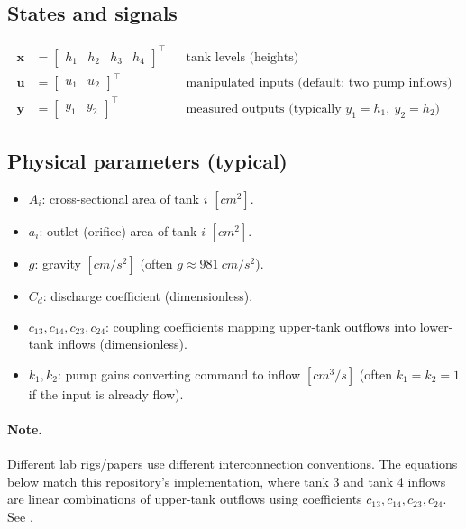 \documentclass[11pt]{article}
\begin{document}
\subsection*{States and signals}
\begin{align*}
\bm{x} &= \begin{bmatrix} h_1 & h_2 & h_3 & h_4 \end{bmatrix}^\top
&&\text{tank levels (heights)}\\
\bm{u} &= \begin{bmatrix} u_1 & u_2 \end{bmatrix}^\top
&&\text{manipulated inputs (default: two pump inflows)}\\
\bm{y} &= \begin{bmatrix} y_1 & y_2 \end{bmatrix}^\top
&&\text{measured outputs (typically }y_1=h_1,\ y_2=h_2\text{)}
\end{align*}

\subsection*{Physical parameters (typical)}
\begin{itemize}
  \item \(A_i\): cross-sectional area of tank \(i\) \([\si{cm^2}]\).
  \item \(a_i\): outlet (orifice) area of tank \(i\) \([\si{cm^2}]\).
  \item \(g\): gravity \([\si{cm/s^2}]\) (often \(g \approx 981\ \si{cm/s^2}\)).
  \item \(C_d\): discharge coefficient (dimensionless).
  \item \(c_{13},c_{14},c_{23},c_{24}\): coupling coefficients mapping upper-tank outflows into lower-tank inflows (dimensionless).
  \item \(k_1, k_2\): pump gains converting command to inflow \([\si{cm^3/s}]\) (often \(k_1=k_2=1\) if the input is already flow).
\end{itemize}

\paragraph{Note.}
Different lab rigs/papers use different interconnection conventions. The equations below match this repository's implementation, where tank 3 and tank 4 inflows are linear combinations of upper-tank outflows using coefficients \(c_{13},c_{14},c_{23},c_{24}\). See .
\end{document}
